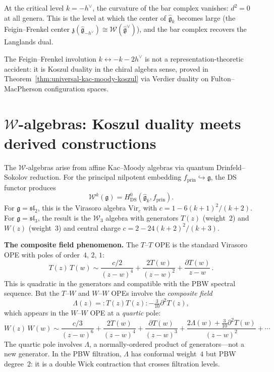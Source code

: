 At the critical level $k = -h^\vee$, the curvature of the bar
complex vanishes: $d^2 = 0$ at all genera.  This is the level at
which the center of $\widehat{\mathfrak{g}}_k$ becomes large
(the Feigin--Frenkel center $\mathfrak{z}(\widehat{\mathfrak{g}}_{-h^\vee})
\cong \mathcal{W}(\widehat{\mathfrak{g}}^\vee)$), and the bar
complex recovers the Langlands dual.

The Feigin--Frenkel involution $k \leftrightarrow -k - 2h^\vee$
is not a representation-theoretic accident: it is Koszul duality
in the chiral algebra sense, proved in
Theorem~\ref{thm:universal-kac-moody-koszul} via Verdier duality
on Fulton--MacPherson configuration spaces.

\section{\texorpdfstring{$\mathcal{W}$-algebras: Koszul duality meets derived constructions}{$\mathcal{W}$-algebras: Koszul duality meets derived constructions}}
\label{sec:frame-w-algebras}

The $\mathcal{W}$-algebras arise from affine Kac--Moody algebras
via quantum Drinfeld--Sokolov reduction.  For the principal nilpotent
embedding $f_{\mathrm{prin}} \hookrightarrow \mathfrak{g}$, the DS
functor produces
\begin{equation}\label{eq:frame-ds-definition}
\mathcal{W}^k(\mathfrak{g})
= H^0_{\mathrm{DS}}(\widehat{\mathfrak{g}}_k, f_{\mathrm{prin}}).
\end{equation}
For $\mathfrak{g} = \mathfrak{sl}_2$, this is the Virasoro algebra
$\mathrm{Vir}_c$ with $c = 1 - 6(k+1)^2/(k+2)$.
For $\mathfrak{g} = \mathfrak{sl}_3$, the result is the
$\mathcal{W}_3$ algebra with generators $T(z)$ (weight~$2$) and
$W(z)$ (weight~$3$) and central charge $c = 2 - 24(k+2)^2/(k+3)$.

\medskip
\noindent\textbf{The composite field phenomenon.}
The $T$--$T$ OPE is the standard Virasoro OPE with poles of
order~$4$, $2$, $1$:
\[
T(z)\,T(w) \sim \frac{c/2}{(z-w)^4}
  + \frac{2T(w)}{(z-w)^2}
  + \frac{\partial T(w)}{z-w}\,.
\]
This is quadratic in the generators and compatible with the
PBW spectral sequence.  But the $T$--$W$ and $W$--$W$ OPEs
involve the \emph{composite field}
\begin{equation}\label{eq:frame-w3-composite}
\Lambda(z) = :\!T(z)T(z)\!: - \tfrac{3}{10}\partial^2 T(z),
\end{equation}
which appears in the $W$--$W$ OPE at a \emph{quartic} pole:
\[
W(z)\,W(w) \sim \frac{c/3}{(z-w)^6}
  + \frac{2T(w)}{(z-w)^4}
  + \frac{\partial T(w)}{(z-w)^3}
  + \frac{2\Lambda(w) + \tfrac{3}{10}\partial^2 T(w)}{(z-w)^2}
  + \cdots
\]
The quartic pole involves $\Lambda$, a normally-ordered product of
generators---not a new generator.  In the PBW filtration, $\Lambda$
has conformal weight~$4$ but PBW degree~$2$: it is a double Wick
contraction that crosses filtration levels.

